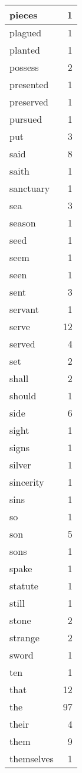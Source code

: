 \begin{center}
\begin{longtable}{l|r}
pieces & 1\\ \hline 
plagued & 1\\ \hline 
planted & 1\\ \hline 
possess & 2\\ \hline 
presented & 1\\ \hline 
preserved & 1\\ \hline 
pursued & 1\\ \hline 
put & 3\\ \hline 
said & 8\\ \hline 
saith & 1\\ \hline 
sanctuary & 1\\ \hline 
sea & 3\\ \hline 
season & 1\\ \hline 
seed & 1\\ \hline 
seem & 1\\ \hline 
seen & 1\\ \hline 
sent & 3\\ \hline 
servant & 1\\ \hline 
serve & 12\\ \hline 
served & 4\\ \hline 
set & 2\\ \hline 
shall & 2\\ \hline 
should & 1\\ \hline 
side & 6\\ \hline 
sight & 1\\ \hline 
signs & 1\\ \hline 
silver & 1\\ \hline 
sincerity & 1\\ \hline 
sins & 1\\ \hline 
so & 1\\ \hline 
son & 5\\ \hline 
sons & 1\\ \hline 
spake & 1\\ \hline 
statute & 1\\ \hline 
still & 1\\ \hline 
stone & 2\\ \hline 
strange & 2\\ \hline 
sword & 1\\ \hline 
ten & 1\\ \hline 
that & 12\\ \hline 
the & 97\\ \hline 
their & 4\\ \hline 
them & 9\\ \hline 
themselves & 1\\ \hline 

\end{longtable}
\end{center}
